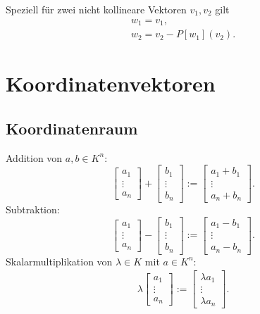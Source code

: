 Speziell für zwei nicht kollineare Vektoren $v_1,v_2$ gilt
\begin{gather}
w_1=v_1,\\
w_2=v_2-P[w_1](v_2).
\end{gather}
\section{Koordinatenvektoren}
\subsection{Koordinatenraum}
Addition von $a,b\in K^n$:
\begin{equation}\label{eq:Koordinatenraum-Addition}
\begin{bmatrix}
a_1\\
\vdots\\
a_n
\end{bmatrix}
+\begin{bmatrix}
b_1\\
\vdots\\
b_n
\end{bmatrix}
:= \begin{bmatrix}
a_1+b_1\\
\vdots\\
a_n+b_n
\end{bmatrix}.
\end{equation}
Subtraktion:
\begin{equation}
\begin{bmatrix}
a_1\\
\vdots\\
a_n
\end{bmatrix}
-\begin{bmatrix}
b_1\\
\vdots\\
b_n
\end{bmatrix}
:= \begin{bmatrix}
a_1-b_1\\
\vdots\\
a_n-b_n
\end{bmatrix}.
\end{equation}
Skalarmultiplikation von $\lambda\in K$ mit $a\in K^n$:
\begin{align}\label{eq:Koordinatenraum-Skalarmultiplikation}
\lambda\begin{bmatrix}
a_1\\
\vdots\\
a_n
\end{bmatrix}
:= \begin{bmatrix}
\lambda a_1\\
\vdots\\
\lambda a_n
\end{bmatrix}.
\end{align}
